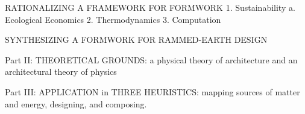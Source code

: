 

\clearpage

RATIONALIZING A FRAMEWORK FOR FORMWORK
  1. Sustainability
    a. Ecological Economics
  2. Thermodynamics
  3. Computation

SYNTHESIZING A FORMWORK FOR RAMMED-EARTH DESIGN

Part II: THEORETICAL GROUNDS: a physical theory of architecture and an architectural theory of physics

Part III: APPLICATION in THREE HEURISTICS: mapping sources of matter and energy, designing, and composing.

